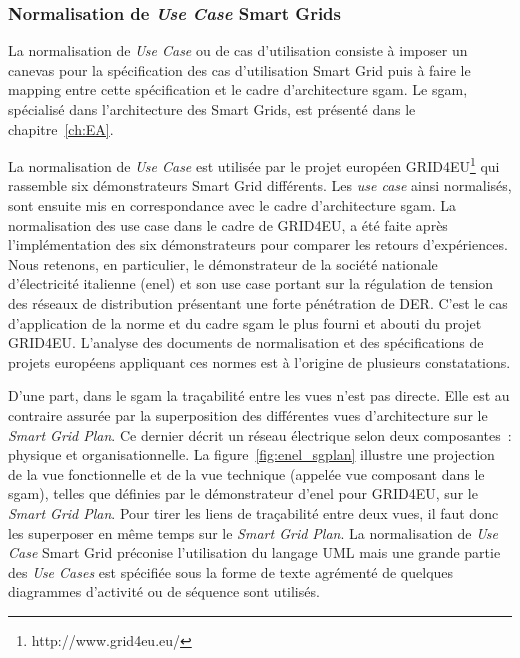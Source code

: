 \subsubsection{Normalisation de \textit{Use Case} Smart Grids}
\label{sec:ENEL}

La normalisation de \textit{Use Case} ou de cas d'utilisation consiste à
imposer un canevas pour la spécification des cas d'utilisation Smart Grid puis à
faire le mapping entre cette spécification et le cadre d'architecture
\gls{sgam}. Le \gls{sgam}, spécialisé dans l'architecture des Smart Grids, est
présenté dans le chapitre~\ref{ch:EA}.

La normalisation de \textit{Use Case} est utilisée par le projet européen
GRID4EU\footnote{http://www.grid4eu.eu/} qui rassemble six démonstrateurs Smart
Grid différents. Les \textit{use case} ainsi normalisés, sont ensuite mis en
correspondance avec le cadre d'architecture \gls{sgam}. La normalisation des use
case dans le cadre de GRID4EU, a été faite après l'implémentation des six
démonstrateurs pour comparer les retours d'expériences. Nous retenons, en
particulier, le démonstrateur de la société nationale d'électricité italienne
(\gls{enel}) et son use case portant sur la régulation de tension des réseaux de
distribution présentant une forte pénétration de DER. C'est le cas d'application
de la norme et du cadre \gls{sgam} le plus fourni et abouti du projet GRID4EU.
L'analyse des documents de normalisation et des spécifications de projets
européens appliquant ces normes est à l'origine de plusieurs constatations.

D'une part, dans le \gls{sgam} la traçabilité entre les vues n'est pas directe.
Elle est au contraire assurée par la superposition des différentes vues
d'architecture sur le \textit{Smart Grid Plan}. Ce dernier décrit un réseau
électrique selon deux composantes~: physique et organisationnelle. La
figure~\ref{fig:enel_sgplan} illustre une projection de la vue fonctionnelle et
de la vue technique (appelée vue composant dans le \gls{sgam}), telles que
définies par le démonstrateur d'\gls{enel} pour GRID4EU, sur le \textit{Smart
Grid Plan}. Pour tirer les liens de traçabilité entre deux vues, il faut donc
les superposer en même temps sur le \textit{Smart Grid Plan}. La normalisation
de \textit{Use Case} Smart Grid préconise l'utilisation du langage UML mais une
grande partie des \textit{Use Cases} est spécifiée sous la forme de texte
agrémenté de quelques diagrammes d'activité ou de séquence sont utilisés.

